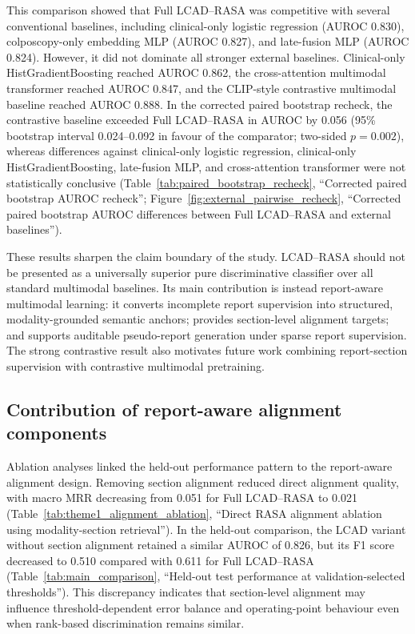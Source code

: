 This comparison showed that Full LCAD--RASA was competitive with several conventional baselines, including clinical-only logistic regression (AUROC 0.830), colposcopy-only embedding MLP (AUROC 0.827), and late-fusion MLP (AUROC 0.824). However, it did not dominate all stronger external baselines. Clinical-only HistGradientBoosting reached AUROC 0.862, the cross-attention multimodal transformer reached AUROC 0.847, and the CLIP-style contrastive multimodal baseline reached AUROC 0.888. In the corrected paired bootstrap recheck, the contrastive baseline exceeded Full LCAD--RASA in AUROC by 0.056 (95\% bootstrap interval 0.024--0.092 in favour of the comparator; two-sided $p=0.002$), whereas differences against clinical-only logistic regression, clinical-only HistGradientBoosting, late-fusion MLP, and cross-attention transformer were not statistically conclusive (Table~\ref{tab:paired_bootstrap_recheck}, ``Corrected paired bootstrap AUROC recheck''; Figure~\ref{fig:external_pairwise_recheck}, ``Corrected paired bootstrap AUROC differences between Full LCAD--RASA and external baselines'').

These results sharpen the claim boundary of the study. LCAD--RASA should not be presented as a universally superior pure discriminative classifier over all standard multimodal baselines. Its main contribution is instead report-aware multimodal learning: it converts incomplete report supervision into structured, modality-grounded semantic anchors; provides section-level alignment targets; and supports auditable pseudo-report generation under sparse report supervision. The strong contrastive result also motivates future work combining report-section supervision with contrastive multimodal pretraining.

\subsection{Contribution of report-aware alignment components}
\label{subsec:ablation_results}

Ablation analyses linked the held-out performance pattern to the report-aware alignment design. Removing section alignment reduced direct alignment quality, with macro MRR decreasing from 0.051 for Full LCAD--RASA to 0.021 (Table~\ref{tab:theme1_alignment_ablation}, ``Direct RASA alignment ablation using modality-section retrieval''). In the held-out comparison, the LCAD variant without section alignment retained a similar AUROC of 0.826, but its F1 score decreased to 0.510 compared with 0.611 for Full LCAD--RASA (Table~\ref{tab:main_comparison}, ``Held-out test performance at validation-selected thresholds''). This discrepancy indicates that section-level alignment may influence threshold-dependent error balance and operating-point behaviour even when rank-based discrimination remains similar.

